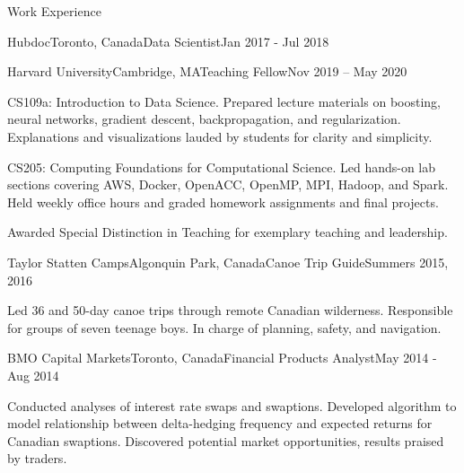 \documentclass{resume} %
\begin{document}
\begin{rSection}{Work Experience}
\begin{rSubsection}{Hubdoc}{Toronto, Canada}{Data Scientist}{Jan 2017 - Jul 2018}
\end{rSubsection}


\begin{rSubsection}{Harvard University}{Cambridge, MA}{Teaching Fellow}{Nov 2019 -- May 2020}

\item
    CS109a: Introduction to Data Science. Prepared lecture materials on boosting, neural networks, gradient descent, backpropagation, and regularization.
    Explanations and visualizations lauded by students for clarity and simplicity.

\item
    CS205: Computing Foundations for Computational Science.
    Led hands-on lab sections covering AWS, Docker, OpenACC, OpenMP, MPI, Hadoop, and Spark.
    Held weekly office hours and graded homework assignments and final projects.

\item
    Awarded Special Distinction in Teaching for exemplary teaching and leadership.

\end{rSubsection}


\begin{rSubsection}{Taylor Statten Camps}{Algonquin Park, Canada}{Canoe Trip Guide}{Summers 2015, 2016}

\item
    Led 36 and 50-day canoe trips through remote Canadian wilderness. Responsible for groups of seven teenage boys. In charge of planning,
    safety, and navigation.

\end{rSubsection}


\begin{rSubsection}{BMO Capital Markets}{Toronto, Canada}{Financial Products Analyst}{May 2014 - Aug 2014}

\item
    Conducted analyses of interest rate swaps and swaptions.
    Developed algorithm to model relationship between delta-hedging frequency and expected returns for Canadian swaptions.
    Discovered potential market opportunities, results praised by traders.

\end{rSubsection}


\end{rSection}
\end{document}
